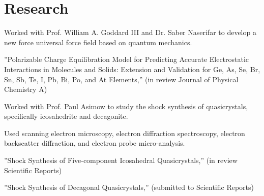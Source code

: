\documentclass[letterpaper]{deedy-resume} %
\begin{document}
\begin{minipage}[t]{0.58\textwidth}






\section{Research}


\begin{tightitemize}
\item Worked with Prof. William A. Goddard III and Dr. Saber Naserifar to develop a new force universal force field based on quantum mechanics. 
\item ''Polarizable Charge Equilibration Model for Predicting Accurate Electrostatic Interactions in Molecules and Solids: Extension and Validation for Ge, As, Se, Br, Sn, Sb, Te, I, Pb, Bi, Po, and At Elements,'' (in review Journal of Physical Chemistry A)
\end{tightitemize}



\begin{tightitemize}
\item Worked with Prof. Paul Asimow to study the shock synthesis of quasicrystals, specifically icosahedrite and decagonite.
\item Used scanning electron microscopy, electron diffraction spectroscopy, electron backscatter diffraction, and electron probe micro-analysis.
\item ''Shock Synthesis of Five-component Icosahedral Quasicrystals,'' (in review Scientific Reports)
\item ''Shock Synthesis of Decagonal Quasicrystals,'' (submitted to Scientific Reports)
\end{tightitemize}


\end{minipage}
\end{document}
